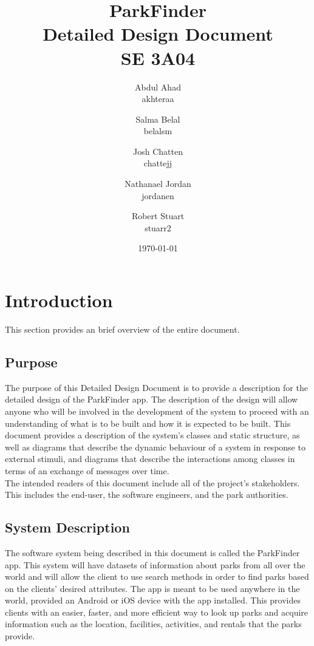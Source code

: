 \documentclass[titlepage,12pt]{article}
\title{ParkFinder\\Detailed Design Document\\SE 3A04}
\author{Abdul Ahad \\ akhteraa \and Salma Belal \\ belalsm \and Josh Chatten \\ chattejj \and
	Nathanael Jordan \\ jordanen \and Robert Stuart \\ stuarr2}
\date{\today}
\begin{document}
\maketitle	
\thispagestyle{empty}
\clearpage
\setcounter{tocdepth}{2}%
\tableofcontents
\clearpage


\section{Introduction}
\label{sec:introduction}

This section provides an brief overview of the entire document.

\subsection{Purpose}
\label{sub:purpose}
The purpose of this Detailed Design Document is to provide a description for the detailed design of
the ParkFinder app. The description of the design will allow anyone who will be involved in the
development of the system to proceed with an understanding of what is to be built and how it is
expected to be built. This document provides a description of the system's classes and static
structure, as well as diagrams that describe the dynamic behaviour of a system in response to
external stimuli, and diagrams that describe the interactions among classes in terms of an exchange
of messages over time.\\

The intended readers of this document include all of the project's stakeholders. This includes the
end-user, the software engineers, and the park authorities.

\subsection{System Description}
\label{sub:system_description}
The software system being described in this document is called the ParkFinder app. This system will
have datasets of information about parks from all over the world and will allow the client to use
search methods in order to find parks based on the clients' desired attributes. The app is meant to
be used anywhere in the world, provided an Android or iOS device with the app installed. This
provides clients with an easier, faster, and more efficient way to look up parks and acquire
information such as the location, facilities, activities, and rentals that the parks provide.
\end{document}
